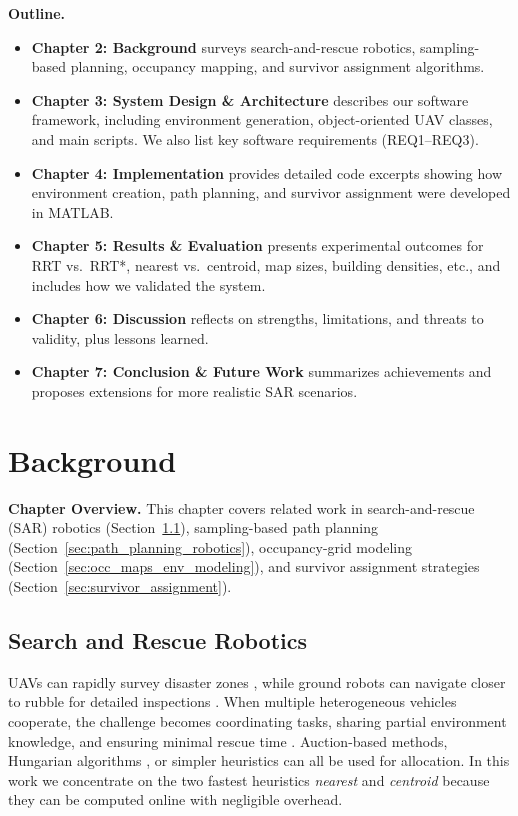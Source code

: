 \documentclass[12pt,a4paper]{report}
\begin{document}
\noindent\textbf{Outline.}
\begin{itemize}
    \item \textbf{Chapter 2: Background} surveys search-and-rescue robotics, sampling-based
    planning, occupancy mapping, and survivor assignment algorithms.
    \item \textbf{Chapter 3: System Design \& Architecture} describes our software
    framework, including environment generation, object-oriented UAV classes, and main scripts.
    We also list key software requirements (REQ1–REQ3).
    \item \textbf{Chapter 4: Implementation} provides detailed code excerpts showing how
    environment creation, path planning, and survivor assignment were developed in MATLAB.
    \item \textbf{Chapter 5: Results \& Evaluation} presents experimental outcomes for
    RRT vs.\ RRT*, nearest vs.\ centroid, map sizes, building densities, etc., and
    includes how we validated the system.
    \item \textbf{Chapter 6: Discussion} reflects on strengths, limitations, and threats
    to validity, plus lessons learned.
    \item \textbf{Chapter 7: Conclusion \& Future Work} summarizes achievements and
    proposes extensions for more realistic SAR scenarios.
\end{itemize}

\chapter{Background}
\label{cha:background}

\textbf{Chapter Overview.} This chapter covers related work in search-and-rescue (SAR)
robotics (Section~\ref{sec:search_rescue_robotics}), sampling-based path planning
(Section~\ref{sec:path_planning_robotics}), occupancy-grid modeling
(Section~\ref{sec:occ_maps_env_modeling}), and survivor assignment strategies
(Section~\ref{sec:survivor_assignment}).

\section{Search and Rescue Robotics}
\label{sec:search_rescue_robotics}
UAVs can rapidly survey disaster zones \cite{Daud2022DroneDisaster}, while ground robots can navigate
closer to rubble for detailed inspections \cite{Erdelj2017MultiUAV}. When multiple heterogeneous
vehicles cooperate, the challenge becomes coordinating tasks, sharing partial environment
knowledge, and ensuring minimal rescue time \cite{Gerkey2004Taxonomy}. Auction-based methods, Hungarian
algorithms \cite{Liu2012FlexibleAssignment}, or simpler heuristics can all be used for allocation. 
In this work we concentrate on the two fastest heuristics \emph{nearest} and \emph{centroid} because they can be computed online with negligible overhead.
\end{document}
